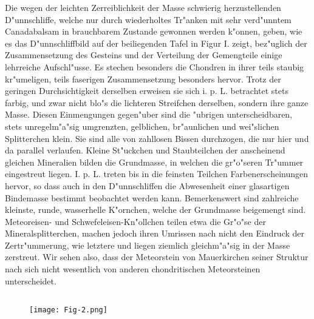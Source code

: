 \documentclass[a4paper, 11pt, oneside]{article}
\begin{document}
Die wegen der leichten Zerreiblichkeit der Masse schwierig herzustellenden D"unnschliffe, welche nur durch wiederholtes Tr"anken mit sehr verd"unntem Canadabalsam in brauchbarem Zustande gewonnen werden k"onnen, geben, wie es das D"unnschliffbild auf der beiliegenden Tafel in Figur I. zeigt, bez"uglich der Zusammensetzung des Gesteins und der Verteilung der Gemengteile einige lehrreiche Aufschl"usse. Es stechen besonders die Chondren in ihrer teils staubig kr"umeligen, teils faserigen Zusammensetzung besonders hervor. Trotz der geringen Durchsichtigkeit derselben erweisen sie sich i. p. L. betrachtet stets farbig, und zwar nicht blo"s die lichteren Streifchen derselben, sondern ihre ganze Masse. Diesen Einmengungen gegen"uber sind die "ubrigen unterscheidbaren, stets unregelm"a"sig umgrenzten, gelblichen, br"aunlichen und wei"slichen Splitterchen klein. Sie sind alle von zahllosen Bissen durchzogen, die nur hier und da parallel verlaufen. Kleine St"uckchen und Staubteilchen der anscheinend gleichen Mineralien bilden die Grundmasse, in welchen die gr"o"seren Tr"ummer eingestreut liegen. I. p. L. treten bis in die feinsten Teilchen Farbenerscheinungen hervor, so dass auch in den D"unnschliffen die Abwesenheit einer glasartigen Bindemasse bestimmt beobachtet werden kann. Bemerkenswert sind zahlreiche kleinste, runde, wasserhelle K"ornchen, welche der Grundmasse beigemengt sind. Meteoreisen- und Schwefeleisen-Kn"ollchen teilen etwa die Gr"o"se der Mineralsplitterchen, machen jedoch ihren Umrissen nach nicht den Eindruck der Zertr"ummerung, wie letztere und liegen ziemlich gleichm"a"sig in der Masse zerstreut. Wir sehen also, dass der Meteorstein von Mauerkirchen seiner Struktur nach sich nicht wesentlich von anderen chondritischen Meteorsteinen unterscheidet.
\clearpage
\subsection{}
\begin{figure}[h]
\centering
\texttt{[image: Fig-2.png]}
\caption{}
\end{figure}
\end{document}
